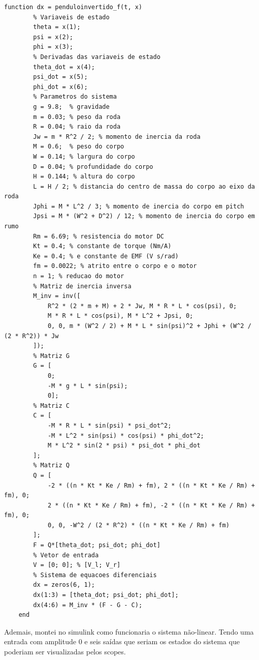 \documentclass[10pt]{article}
\begin{document}
\begin{lstlisting}[caption={penduloinvertido\_f.m}, label=lst:pendulum_dead2]
    function dx = penduloinvertido_f(t, x)
        % Variaveis de estado
        theta = x(1);
        psi = x(2);
        phi = x(3);
        % Derivadas das variaveis de estado
        theta_dot = x(4);
        psi_dot = x(5);
        phi_dot = x(6);
        % Parametros do sistema
        g = 9.8;  % gravidade
        m = 0.03; % peso da roda
        R = 0.04; % raio da roda
        Jw = m * R^2 / 2; % momento de inercia da roda
        M = 0.6;  % peso do corpo
        W = 0.14; % largura do corpo
        D = 0.04; % profundidade do corpo
        H = 0.144; % altura do corpo
        L = H / 2; % distancia do centro de massa do corpo ao eixo da roda
        Jphi = M * L^2 / 3; % momento de inercia do corpo em pitch
        Jpsi = M * (W^2 + D^2) / 12; % momento de inercia do corpo em rumo
        Rm = 6.69; % resistencia do motor DC
        Kt = 0.4; % constante de torque (Nm/A)
        Ke = 0.4; % e constante de EMF (V s/rad)
        fm = 0.0022; % atrito entre o corpo e o motor
        n = 1; % reducao do motor
        % Matriz de inercia inversa
        M_inv = inv([
            R^2 * (2 * m + M) + 2 * Jw, M * R * L * cos(psi), 0;
            M * R * L * cos(psi), M * L^2 + Jpsi, 0;
            0, 0, m * (W^2 / 2) + M * L * sin(psi)^2 + Jphi + (W^2 / (2 * R^2)) * Jw
        ]);
        % Matriz G
        G = [
            0;
            -M * g * L * sin(psi);
            0];
        % Matriz C
        C = [
            -M * R * L * sin(psi) * psi_dot^2;
            -M * L^2 * sin(psi) * cos(psi) * phi_dot^2;
            M * L^2 * sin(2 * psi) * psi_dot * phi_dot
        ];
        % Matriz Q
        Q = [
            -2 * ((n * Kt * Ke / Rm) + fm), 2 * ((n * Kt * Ke / Rm) + fm), 0;
            2 * ((n * Kt * Ke / Rm) + fm), -2 * ((n * Kt * Ke / Rm) + fm), 0;
            0, 0, -W^2 / (2 * R^2) * ((n * Kt * Ke / Rm) + fm)
        ];
        F = Q*[theta_dot; psi_dot; phi_dot]
        % Vetor de entrada
        V = [0; 0]; % [V_l; V_r]
        % Sistema de equacoes diferenciais
        dx = zeros(6, 1);
        dx(1:3) = [theta_dot; psi_dot; phi_dot];
        dx(4:6) = M_inv * (F - G - C);
    end
\end{lstlisting}

\quad Ademais, montei no simulink como funcionaria o sistema não-linear.
Tendo uma entrada com amplitude $0$ e seis saídas que seriam os estados do sistema que poderiam ser visualizadas pelos scopes.
\end{document}
